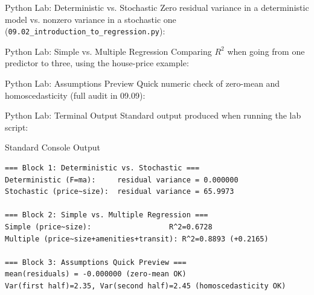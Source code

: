 \documentclass[10pt, aspectratio=169]{beamer}
\begin{document}
\begin{frame}[fragile]{Python Lab: Deterministic vs. Stochastic}
  \scriptsize
  Zero residual variance in a deterministic model vs. nonzero variance in a stochastic one (\texttt{09.02\_introduction\_to\_regression.py}):
  {
  }
\end{frame}

\begin{frame}[fragile]{Python Lab: Simple vs. Multiple Regression}
  \scriptsize
  Comparing $R^2$ when going from one predictor to three, using the house-price example:
  {
  }
\end{frame}

\begin{frame}[fragile]{Python Lab: Assumptions Preview}
  \scriptsize
  Quick numeric check of zero-mean and homoscedasticity (full audit in 09.09):
  {
  }
\end{frame}

\begin{frame}[fragile]{Python Lab: Terminal Output}
  \scriptsize
  Standard output produced when running the lab script:
  \vspace{0.02cm}
  \begin{block}{Standard Console Output}
    \fontsize{3.6pt}{4.3pt}\selectfont
    \begin{verbatim}
=== Block 1: Deterministic vs. Stochastic ===
Deterministic (F=ma):     residual variance = 0.000000
Stochastic (price~size):  residual variance = 65.9973

=== Block 2: Simple vs. Multiple Regression ===
Simple (price~size):                  R^2=0.6728
Multiple (price~size+amenities+transit): R^2=0.8893 (+0.2165)

=== Block 3: Assumptions Quick Preview ===
mean(residuals) = -0.000000 (zero-mean OK)
Var(first half)=2.35, Var(second half)=2.45 (homoscedasticity OK)
    \end{verbatim}
  \end{block}
\end{frame}
\end{document}
